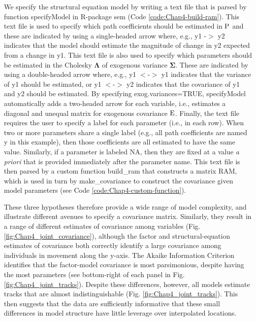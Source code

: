 We specify the structural equation model by writing a text file that is parsed by function \colorbox{backcolour}{specifyModel} in R-package \colorbox{backcolour}{sem} \cite{fox_sem_2020} (Code \ref{code:Chap4-build-ram}).  This text file is used to specify which path coefficients should be estimated in \( \mathbf{\operatorname{P}} \) and these are indicated by using a single-headed arrow where, e.g., \colorbox{backcolour}{y1 -$>$ y2} indicates that the model should estimate the magnitude of change in \colorbox{backcolour}{y2} expected from a change in \colorbox{backcolour}{y1}.  This text file is also used to specify which parameters should be estimated in the Cholesky \( \mathbf{\Lambda} \) of exogenous variance \(\mathbf{\Sigma}\).  These are indicated by using a double-headed arrow where, e.g., \colorbox{backcolour}{y1 $<$-$>$ y1} indicates that the variance of \colorbox{backcolour}{y1} should be estimated, or \colorbox{backcolour}{y1 $<$-$>$ y2} indicates that the covariance of \colorbox{backcolour}{y1} and \colorbox{backcolour}{y2} should be estimated.  By specifying \colorbox{backcolour}{exog.variances=TRUE}, \colorbox{backcolour}{specifyModel} automatically adds a two-headed arrow for each variable, i.e., estimates a diagonal and unequal matrix for exogenous covariance \(\mathbf{\operatorname{E}}\).  Finally, the text file requires the user to specify a label for each parameter (i.e., in each row).  When two or more parameters share a single label (e.g., all path coefficients are named \colorbox{backcolour}{y} in this example), then those coefficients are all estimated to have the same value.  Similarly, if a parameter is labeled \colorbox{backcolour}{NA}, then they are fixed at a value \textit{a priori} that is provided immediately after the parameter name.  This text file is then parsed by a custom function \colorbox{backcolour}{build\_ram} that constructs a matrix \colorbox{backcolour}{RAM}, which is used in turn by \colorbox{backblue}{make\_covariance} to construct the covariance given model parameters (see Code \ref{code:Chap4-custom-function}). 

\lstset{style=Rcode}


These three hypotheses therefore provide a wide range of model complexity, and illustrate different avenues to specify a covariance matrix.  Similarly, they result in a range of different estimates of covariance among variables (Fig. \ref{fig:Chap4_joint_covariance}), although the factor and structural-equation estimates of covariance both correctly identify a large covariance among individuals in movement along the y-axis.  The Akaike Information Criterion identifies that the factor-model covariance is most parsimonious, despite having the most parameters (see bottom-right of each panel in Fig. \ref{fig:Chap4_joint_tracks}).  Despite these differences, however, all models estimate tracks that are almost indistinguishable (Fig. \ref{fig:Chap4_joint_tracks}).  This then suggests that the data are sufficiently informative that these small differences in model structure have little leverage over interpolated locations.  


